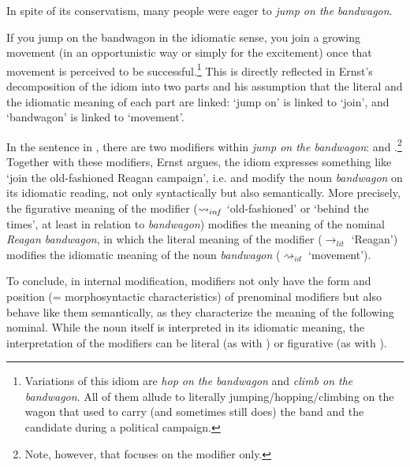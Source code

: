 \documentclass[output=paper]{langsci/langscibook}
\begin{document}
\ea \label{Reagan bandwagon}
In spite of its conservatism, many people were eager to \textit{jump on the} \underline{} \underline{} 
\underline{} \textit{bandwagon}.
\z

\noindent If you jump on the bandwagon in the idiomatic sense, you join a growing movement (in an opportunistic way or simply for the excitement) once that movement is perceived to be successful.\footnote{Variations of this idiom are \textit{hop on the bandwagon} and \textit{climb on the bandwagon}. All of them allude to literally jumping/hopping/climbing on the wagon that used to carry (and sometimes still does) the band and the candidate during a political campaign.}
This is directly reflected in Ernst's decomposition of the idiom into two parts and his assumption that the literal and the idiomatic meaning of each part are linked:  `jump on' is linked to `join', and `bandwagon' is linked to `movement'.

\begin{sloppypar}
  In the sentence in , there are two modifiers
  within \textit{jump on the bandwagon}: \underline{}
  and \underline{}.\footnote{Note, however, that
    \cite{ernst81} focuses on the modifier
    \underline{} only.}  Together with these
  modifiers, Ernst argues, the idiom expresses something like `join
  the old-fashioned Reagan campaign', i.e.\@
  \underline{} and \underline{}
  modify the noun \textit{bandwagon} on its idiomatic reading, not
  only syntactically but also semantically. More precisely, the
  figurative meaning of the modifier \underline{}
  ($\rightsquigarrow_{in\hspace{-0.8pt} f}$ `old-fashioned' or `behind
  the times', at least in relation to \textit{bandwagon}) modifies the
  meaning of the nominal \textit{Reagan bandwagon}, in which the
  literal meaning of the modifier \underline{}
  ($\rightarrow_{lit}$ `Reagan') modifies the idiomatic meaning of the
  noun \textit{bandwagon} ($\rightsquigarrow_{id}$ `movement').
\end{sloppypar}
To conclude, in internal modification, modifiers %
not only have the form and position (= morphosyntactic characteristics) of prenominal modifiers but also behave like them semantically, as they characterize the meaning of the following nominal. While the noun itself is interpreted in its idiomatic meaning, the interpretation of the modifiers can be literal (as with \underline{}) or figurative (as with \underline{}).
\end{document}
